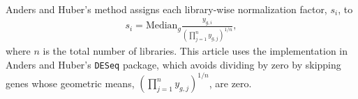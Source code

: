 \documentclass[10pt]{article}
\begin{document}
\paragraph{} \indent Anders and Huber's method assigns each library-wise normalization factor, $s_i$, to %
%
%
%
\begin{align*}
s_i = \text{Median}_g \frac{y_{g, i}}{ \left (\prod_{j = 1}^n y_{g, j} \right)^{1/n}},
\end{align*}
where $n$ is the total number of libraries. This article uses the implementation in Anders and Huber's {\tt DESeq} package, which avoids dividing by zero by skipping genes whose geometric means, $\left (\prod_{j = 1}^n y_{g, j} \right)^{1/n}$, are zero.
\end{document}
